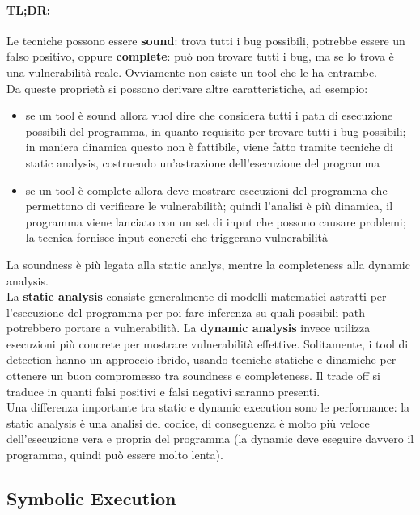 \paragraph{TL;DR:} Le tecniche possono essere \textbf{sound}: trova tutti i bug possibili, potrebbe essere un falso positivo, oppure \textbf{complete}: può non trovare tutti i bug, ma se lo trova è una vulnerabilità reale. Ovviamente non esiste un tool che le ha entrambe.\\

Da queste proprietà si possono derivare altre caratteristiche, ad esempio:
\begin{itemize}
	\item se un tool è sound allora vuol dire che considera tutti i path di esecuzione possibili del programma, in quanto requisito per trovare tutti i bug possibili; in maniera dinamica questo non è fattibile, viene fatto tramite tecniche di static analysis, costruendo un'astrazione dell'esecuzione del programma
	\item se un tool è complete allora deve mostrare esecuzioni del programma che permettono di verificare le vulnerabilità; quindi l'analisi è più dinamica, il programma viene lanciato con un set di input che possono causare problemi; la tecnica fornisce input concreti che triggerano vulnerabilità
\end{itemize}
La soundness è più legata alla static analys, mentre la completeness alla dynamic analysis.\\

La \textbf{static analysis} consiste generalmente di modelli matematici astratti per l'esecuzione del programma per poi fare inferenza su quali possibili path potrebbero portare a vulnerabilità. La \textbf{dynamic analysis} invece utilizza esecuzioni più concrete per mostrare vulnerabilità effettive. Solitamente, i tool di detection hanno un approccio ibrido, usando tecniche statiche e dinamiche per ottenere un buon compromesso tra soundness e completeness. Il trade off si traduce in quanti falsi positivi e falsi negativi saranno presenti.\\

Una differenza importante tra static e dynamic execution sono le performance: la static analysis è una analisi del codice, di conseguenza è molto più veloce dell'esecuzione vera e propria del programma (la dynamic deve eseguire davvero il programma, quindi può essere molto lenta). \\

\subsection{Symbolic Execution}

